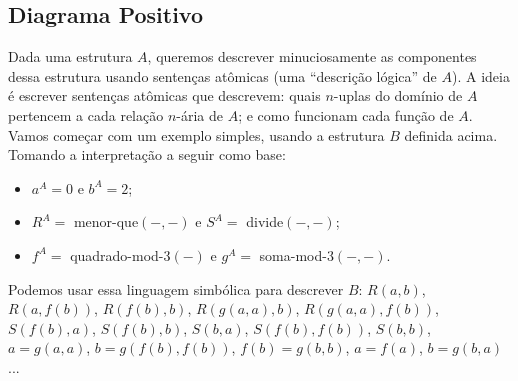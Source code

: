 \subsection{Diagrama Positivo}
Dada uma estrutura $A$, queremos descrever minuciosamente as componentes dessa estrutura usando sentenças atômicas (uma ``descrição lógica'' de $A$). A ideia é escrever sentenças atômicas que descrevem: quais $n$-uplas do domínio de $A$ pertencem a cada relação $n$-ária de $A$; e como funcionam cada função de $A$. Vamos começar com um exemplo simples, usando a estrutura $B$ definida acima. Tomando a interpretação a seguir como base:
\begin{itemize}
    \item $a^A = 0$ e $b^A = 2$;
    \item $R^A =$ menor-que$(-,-)$ e $S^A =$ divide$(-,-)$;
    \item $f^A =$ quadrado-mod-3$(-)$ e $g^A =$ soma-mod-3$(-,-)$.
\end{itemize}
Podemos usar essa linguagem simbólica para descrever $B$: $R(a,b)$, $R(a, f(b))$, $R(f(b), b)$, $R(g(a,a), b)$, $R(g(a,a), f(b))$, $S(f(b), a)$, $S(f(b), b)$, $S(b, a)$, $S(f(b),f(b))$, $S(b,b)$, $a = g(a,a)$, $b = g(f(b),f(b))$, $f(b) = g(b,b)$, $a = f(a)$, $b = g(b, a)$...

